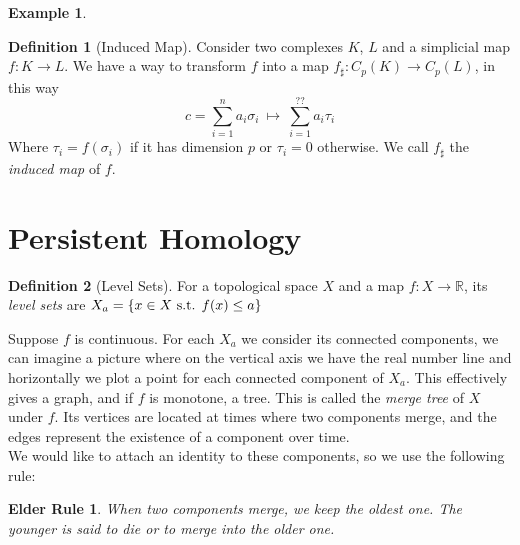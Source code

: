 \documentclass{article}
\newcommand{\R}{\mathbb{R}}
\newcommand{\st}{\textmd{ s.t. }}
\theoremstyle{plain}
\newtheorem*{ER}{Elder Rule}
\theoremstyle{definition}
\newtheorem{definition}{Definition}[section]
\newtheorem{example}{Example}[section]
\theoremstyle{remark}
\begin{document}
\begin{example}
\begin{figure}[ht!]
\begin{center}
\label{fig:example1}
\end{center}
\end{figure}
\end{example}


\begin{definition}[Induced Map]
	Consider two complexes $K$, $L$ and a simplicial map $ f: K \to L $. We have a way to transform $f$ into a map $ f_\sharp: C_p(K) \to C_p(L) $, in this way 
	\[ c = \sum_{i=1}^n a_i \sigma_i \ \mapsto \ \sum_{i=1}^{??} a_i \tau_i  \]
	Where $ \tau_i = f(\sigma_i) $ if it has dimension $p$ or $ \tau_i =0 $ otherwise. We call $f_\sharp$ the \emph{induced map} of $f$.
\end{definition}

\section{Persistent Homology}

\begin{definition}[Level Sets]
For a topological space $X$ and a map $f:X\to \R$, its \emph{level sets} are $ X_a=\{ x \in X \st f(x) \leq a\} $
\end{definition}

Suppose $f$ is continuous. For each $X_a$ we consider its connected components, we can imagine a picture where on the vertical axis we have the real number line and horizontally we plot a point for each connected component of $X_a$. This effectively gives a graph, and if $f$ is monotone, a tree. This is called the \emph{merge tree} of $X$ under $f$. Its vertices are located at times where two components merge, and the edges represent the existence of a component over time. \\
We would like to attach an identity to these components, so we use the following rule:
\begin{ER}
When two components merge, we keep the oldest one. The younger is said to die or to merge into the older one.
\end{ER}
\end{document}
